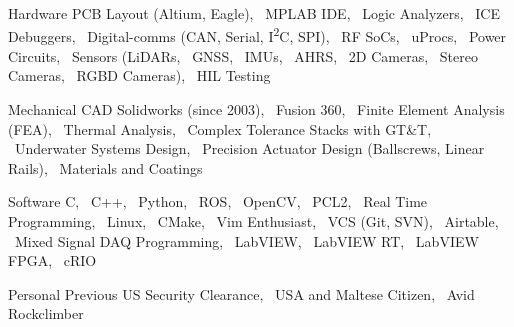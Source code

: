 
\begin{cvskills}

  \cvskill%
      {Hardware} 
      {
            PCB Layout (Altium, Eagle),
            \ MPLAB IDE, 
            \ Logic Analyzers, 
            \ ICE Debuggers, 
            \ Digital-comms (CAN, Serial, I\textsuperscript{2}C, SPI),
            \ RF SoCs, 
            \ uProcs, 
            \ Power Circuits, 
            \ Sensors (LiDARs, 
            \ GNSS, 
            \ IMUs, 
            \ AHRS, 
            \ 2D Cameras, 
            \ Stereo Cameras,  
            \ RGBD Cameras),
            \ HIL Testing
      }

  \cvskill%
      {Mechanical}
      {
            CAD Solidworks (since 2003),
            \ Fusion 360,
            \ Finite Element Analysis (FEA),
            \ Thermal Analysis,
            \ Complex Tolerance Stacks with GT\&T,
            \ Underwater Systems Design,
            \ Precision Actuator Design (Ballscrews, Linear Rails), 
            \ Materials and Coatings
      }

  \cvskill%
      {Software}
      {
            C,  
            \ C++,  
            \ Python,  
            \ ROS,  
            \ OpenCV,  
            \ PCL2,
            \ Real Time Programming,  
            \ Linux,  
            \ CMake,  
            \ Vim Enthusiast,
            \ VCS (Git, SVN),  
            \ Airtable,
            \ Mixed Signal DAQ Programming,  
            \ LabVIEW,  
            \ LabVIEW RT,  
            \ LabVIEW FPGA,  
            \ cRIO
        }

  \cvskill%
      {Personal}
      {
            Previous US Security Clearance, 
            \ USA and Maltese Citizen, 
            \ Avid Rockclimber
      }

\end{cvskills}
